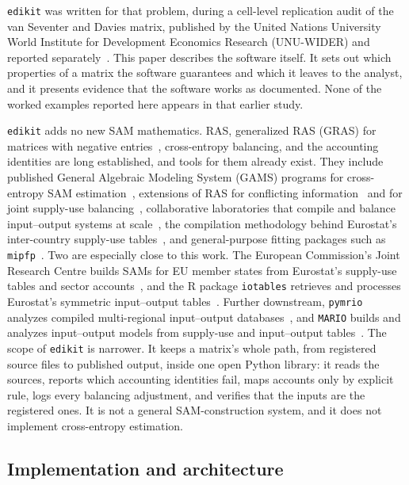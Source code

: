 \documentclass[11pt,a4paper]{article}
\begin{document}
\texttt{edikit} was written for that problem, during a cell-level
replication audit of the van Seventer and Davies matrix, published by the
United Nations University World Institute for Development Economics
Research (UNU-WIDER) and reported separately~\cite{abalo2026}. This paper
describes the software itself. It sets out which properties of a matrix
the software guarantees and which it leaves to the analyst, and it
presents evidence that the software works as documented. None of the
worked examples reported here appears in that earlier study.

\texttt{edikit} adds no new SAM mathematics. RAS, generalized RAS (GRAS)
for matrices with negative entries~\cite{junius2003,temurshoev2013},
cross-entropy balancing, and the accounting identities are long
established, and tools for them already exist. They include published
General Algebraic Modeling System (GAMS) programs for cross-entropy SAM estimation~\cite{robinson2000gams},
extensions of RAS for conflicting information~\cite{lenzen2009} and for
joint supply-use balancing~\cite{temurshoev2011}, collaborative
laboratories that compile and balance input--output systems at scale~\cite{lenzen2014}, the compilation methodology behind Eurostat's
inter-country supply-use tables~\cite{eurostat2019figaro}, and
general-purpose fitting packages such as \texttt{mipfp}~\cite{barthelemy2018}. Two are especially close to this work. The European
Commission's Joint Research Centre builds SAMs for EU member states from
Eurostat's supply-use tables and sector accounts~\cite{fuentes2017}, and
the R package \texttt{iotables} retrieves and processes Eurostat's
symmetric input--output tables~\cite{antal2025iotables}. Further
downstream, \texttt{pymrio} analyzes compiled multi-regional input--output
databases~\cite{stadler2021}, and \texttt{MARIO} builds and analyzes
input--output models from supply-use and input--output tables~\cite{tahavori2023}. The scope of \texttt{edikit} is narrower. It keeps a matrix's whole path,
from registered source files to published output, inside one open Python
library: it reads the sources, reports which accounting identities fail,
maps accounts only by explicit rule, logs every balancing adjustment, and
verifies that the inputs are the registered ones. It is not a general SAM-construction system, and it does not implement
cross-entropy estimation.

\subsection{Implementation and architecture}
\end{document}
